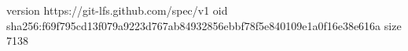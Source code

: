 version https://git-lfs.github.com/spec/v1
oid sha256:f69f795cd13f079a9223d767ab84932856ebbf78f5e840109e1a0f16e38e616a
size 7138
